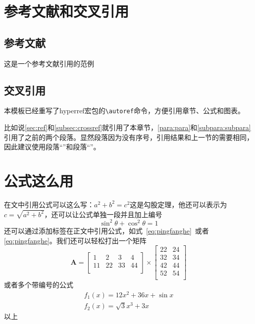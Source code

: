 \documentclass[supercite]{HustGraduPaper}
\begin{document}
\section{参考文献和交叉引用}\label{sec:ref}
\subsection{参考文献}
这是一个参考文献引用的范例\cite{9326394, Renzo2019,5502350, liang2019large, CHN_zhou2020, CHN_zhang2017}




\subsection{交叉引用}\label{subsec:crossref}
本模板已经重写了hyperref宏包的\verb|\autoref|命令，方便引用章节、公式和图表。

比如说\autoref{sec:ref}和\autoref{subsec:crossref}就引用了本章节，\autoref{para:para}和\autoref{subpara:subpara}引用了之前的两个段落。显然段落因为没有序号，引用结果和上一节的需要相同，因此建议使用段落“”和段落“”。

\section{公式这么用}
在文中引用公式可以这么写：$a^2+b^2=c^2$这是勾股定理，他还可以表示为$c=\sqrt{a^2+b^2}$，还可以让公式单独一段并且加上编号
\begin{equation}
	\sin^2{\theta}+\cos^2{\theta}=1 \label{eq:pingfanghe}
\end{equation}
还可以通过添加标签在正文中引用公式，如式~\eqref{eq:pingfanghe}~或者\autoref{eq:pingfanghe}。我们还可以轻松打出一个矩阵
\begin{equation}
	\bm{A}=\begin{bmatrix}
		1  & 2  & 3  & 4  \\
		11 & 22 & 33 & 44 \\
	\end{bmatrix}
	\times\begin{bmatrix}
		22 & 24 \\
		32 & 34 \\
		42 & 44 \\
		52 & 54 \\
	\end{bmatrix}
\end{equation}
或者多个带编号的公式
\begin{eqnarray}
	f_1(x)=12x^2+36x+\sin x\\
	f_2(x)=\sqrt{3}{x^3+3x}
\end{eqnarray}
以上
\end{document}
